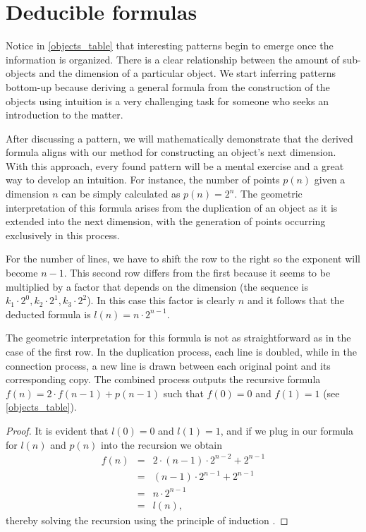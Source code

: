 \documentclass{article}
\begin{document}
	\section{Deducible formulas \label{sec:deducible}}
	
	Notice in \autoref{objects_table} that interesting patterns begin to emerge once the information is organized. There is a clear relationship between the amount of sub-objects and the dimension of a particular object. We start inferring patterns bottom-up because deriving a general formula from the construction of the objects using intuition is a very challenging task for someone who seeks an introduction to the matter.
	
	After discussing a pattern, we will mathematically demonstrate that the derived formula aligns with our method for constructing an object's next dimension. With this approach, every found pattern will be a mental exercise and a great way to develop an intuition. For instance, the number of points $p(n)$ given a dimension $n$ can be simply calculated as $p(n) = 2^{n}$. The geometric interpretation of this formula arises from the duplication of an object as it is extended into the next dimension, with the generation of points occurring exclusively in this process.
	
	For the number of lines, we have to shift the row to the right so the exponent will become $n-1$. This second row differs from the first because it seems to be multiplied by a factor that depends on the dimension (the sequence is $k_1 \cdot 2^{0}, k_2 \cdot 2^{1}, k_3 \cdot 2^{2}$). In this case this factor is clearly $n$ and it follows that the deducted formula is $l(n) = n \cdot 2^{n-1}$.
	
	The geometric interpretation for this formula is not as straightforward as in the case of the first row. In the duplication process, each line is doubled, while in the connection process, a new line is drawn between each original point and its corresponding copy. The combined process outputs the recursive formula $f(n) = 2 \cdot f(n-1) + p(n-1)$ such that $f(0) = 0$ and $f(1) = 1$ (see \autoref{objects_table}).
	
	\begin{proof}
		 It is evident that $l(0) = 0$ and $l(1) = 1$, and if we plug in our formula for $l(n)$ and $p(n)$ into the recursion we obtain
		\begin{eqnarray*}
			f(n) & = & 2 \cdot (n-1) \cdot 2^{n-2} + 2^{n-1}\\
			& = & (n-1) \cdot 2^{n-1} + 2^{n-1}\\
			& = & n \cdot 2^{n-1}\\
			& = & l(n),
		\end{eqnarray*}
		thereby solving the recursion using the principle of induction \cite{rosen2011discrete}.
	\end{proof}
\end{document}
